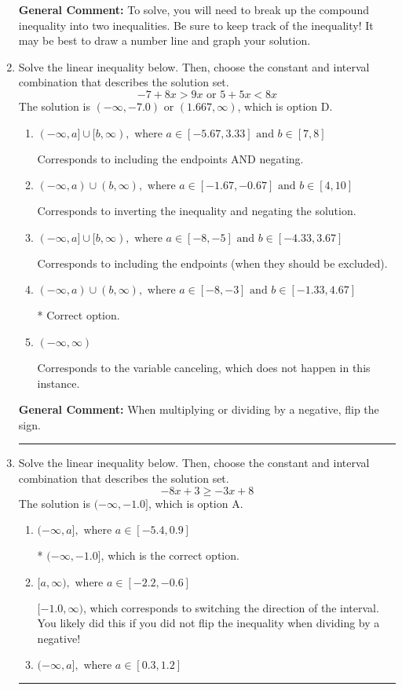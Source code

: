 \documentclass{extbook}[14pt]
\newcommand{\litem}[1]{\item #1

\rule{\textwidth}{0.4pt}}
\begin{document}
\begin{enumerate}
{\begin{enumerate}[label=\Alph*.]
\end{enumerate}

\textbf{General Comment:} To solve, you will need to break up the compound inequality into two inequalities. Be sure to keep track of the inequality! It may be best to draw a number line and graph your solution.
}
\litem{
Solve the linear inequality below. Then, choose the constant and interval combination that describes the solution set.
\[ -7 + 8 x > 9 x \text{ or } 5 + 5 x < 8 x \]The solution is \( (-\infty, -7.0) \text{ or } (1.667, \infty) \), which is option D.\begin{enumerate}[label=\Alph*.]
\item \( (-\infty, a] \cup [b, \infty), \text{ where } a \in [-5.67, 3.33] \text{ and } b \in [7, 8] \)

Corresponds to including the endpoints AND negating.
\item \( (-\infty, a) \cup (b, \infty), \text{ where } a \in [-1.67, -0.67] \text{ and } b \in [4, 10] \)

Corresponds to inverting the inequality and negating the solution.
\item \( (-\infty, a] \cup [b, \infty), \text{ where } a \in [-8, -5] \text{ and } b \in [-4.33, 3.67] \)

Corresponds to including the endpoints (when they should be excluded).
\item \( (-\infty, a) \cup (b, \infty), \text{ where } a \in [-8, -3] \text{ and } b \in [-1.33, 4.67] \)

 * Correct option.
\item \( (-\infty, \infty) \)

Corresponds to the variable canceling, which does not happen in this instance.
\end{enumerate}

\textbf{General Comment:} When multiplying or dividing by a negative, flip the sign.
}
\litem{
Solve the linear inequality below. Then, choose the constant and interval combination that describes the solution set.
\[ -8x + 3 \geq -3x + 8 \]The solution is \( (-\infty, -1.0] \), which is option A.\begin{enumerate}[label=\Alph*.]
\item \( (-\infty, a], \text{ where } a \in [-5.4, 0.9] \)

* $(-\infty, -1.0]$, which is the correct option.
\item \( [a, \infty), \text{ where } a \in [-2.2, -0.6] \)

 $[-1.0, \infty)$, which corresponds to switching the direction of the interval. You likely did this if you did not flip the inequality when dividing by a negative!
\item \( (-\infty, a], \text{ where } a \in [0.3, 1.2] \)


\end{enumerate}}
\end{enumerate}
\end{document}
